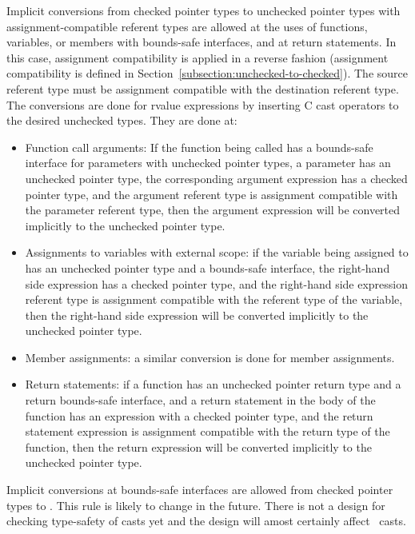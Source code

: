 Implicit conversions from checked pointer types to unchecked pointer types
with assignment-compatible referent types are allowed at the uses of functions,
variables, or members with bounds-safe interfaces, and at return statements.  
In this case, assignment compatibility is applied in a reverse fashion (assignment compatibility
is defined in Section~\ref{subsection:unchecked-to-checked}).
The source referent type must be
assignment compatible with the destination referent type.  The conversions are
done for rvalue expressions by inserting C cast operators to the desired unchecked types.
They are done at:
\begin{itemize}
\item Function call arguments: If the function being called has a
      bounds-safe interface for parameters with unchecked pointer types, a parameter
      has an unchecked pointer type, the corresponding argument expression
      has a checked pointer type, and the argument referent type is assignment
      compatible with the parameter referent type, then the argument expression
      will be converted implicitly to the unchecked pointer type.
\item Assignments to variables with external scope: if the variable being
     assigned to has an unchecked pointer type and a bounds-safe interface, the
     right-hand side expression has a checked pointer type, and the right-hand
     side expression referent type is assignment compatible with the referent
     type of the variable, then the right-hand side expression will be converted
     implicitly to the unchecked pointer type.
\item
    Member assignments: a similar conversion is done for member assignments.
\item Return statements: if a function has an unchecked pointer return type and a
  return bounds-safe interface, and a return statement in the body of the function
  has an expression with a checked pointer type, and the return statement expression is
  assignment compatible with the return type of the function, then the return expression
  will be converted implicitly to the unchecked pointer type.
\end{itemize}

Implicit conversions at bounds-safe interfaces are allowed from checked pointer types to
\uncheckedptrvoid.  This rule is likely to change in the future.  There is not a  design for
checking type-safety of casts yet and the design will amost certainly affect 
\uncheckedptrvoid\ casts.

